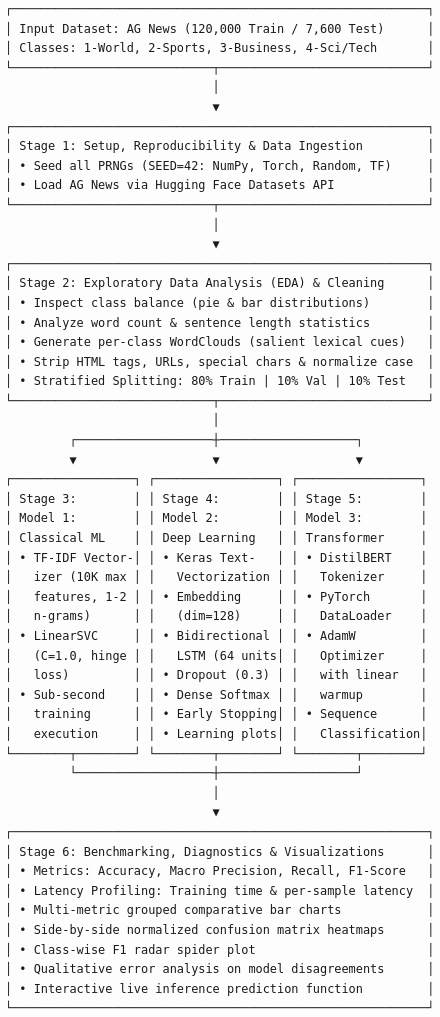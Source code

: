 \documentclass[12pt,a4paper,oneside]{report}
\begin{document}
\begin{Verbatim}[breaklines=true,breakanywhere=true,fontsize=\scriptsize,frame=leftline,framesep=2mm]
┌──────────────────────────────────────────────────────────┐
│ Input Dataset: AG News (120,000 Train / 7,600 Test)      │
│ Classes: 1-World, 2-Sports, 3-Business, 4-Sci/Tech       │
└────────────────────────────┬─────────────────────────────┘
                             │
                             ▼
┌──────────────────────────────────────────────────────────┐
│ Stage 1: Setup, Reproducibility & Data Ingestion         │
│ • Seed all PRNGs (SEED=42: NumPy, Torch, Random, TF)     │
│ • Load AG News via Hugging Face Datasets API             │
└────────────────────────────┬─────────────────────────────┘
                             │
                             ▼
┌──────────────────────────────────────────────────────────┐
│ Stage 2: Exploratory Data Analysis (EDA) & Cleaning      │
│ • Inspect class balance (pie & bar distributions)        │
│ • Analyze word count & sentence length statistics        │
│ • Generate per-class WordClouds (salient lexical cues)   │
│ • Strip HTML tags, URLs, special chars & normalize case  │
│ • Stratified Splitting: 80% Train | 10% Val | 10% Test   │
└────────────────────────────┬─────────────────────────────┘
                             │
         ┌───────────────────┼───────────────────┐
         ▼                   ▼                   ▼
┌─────────────────┐ ┌─────────────────┐ ┌─────────────────┐
│ Stage 3:        │ │ Stage 4:        │ │ Stage 5:        │
│ Model 1:        │ │ Model 2:        │ │ Model 3:        │
│ Classical ML    │ │ Deep Learning   │ │ Transformer     │
│ • TF-IDF Vector-│ │ • Keras Text-   │ │ • DistilBERT    │
│   izer (10K max │ │   Vectorization │ │   Tokenizer     │
│   features, 1-2 │ │ • Embedding     │ │ • PyTorch       │
│   n-grams)      │ │   (dim=128)     │ │   DataLoader    │
│ • LinearSVC     │ │ • Bidirectional │ │ • AdamW         │
│   (C=1.0, hinge │ │   LSTM (64 units│ │   Optimizer     │
│   loss)         │ │ • Dropout (0.3) │ │   with linear   │
│ • Sub-second    │ │ • Dense Softmax │ │   warmup        │
│   training      │ │ • Early Stopping│ │ • Sequence      │
│   execution     │ │ • Learning plots│ │   Classification│
└────────┬────────┘ └────────┬────────┘ └────────┬────────┘
         └───────────────────┼───────────────────┘
                             │
                             ▼
┌──────────────────────────────────────────────────────────┐
│ Stage 6: Benchmarking, Diagnostics & Visualizations      │
│ • Metrics: Accuracy, Macro Precision, Recall, F1-Score   │
│ • Latency Profiling: Training time & per-sample latency  │
│ • Multi-metric grouped comparative bar charts            │
│ • Side-by-side normalized confusion matrix heatmaps      │
│ • Class-wise F1 radar spider plot                        │
│ • Qualitative error analysis on model disagreements      │
│ • Interactive live inference prediction function         │
└──────────────────────────────────────────────────────────┘
\end{Verbatim}
\end{document}
